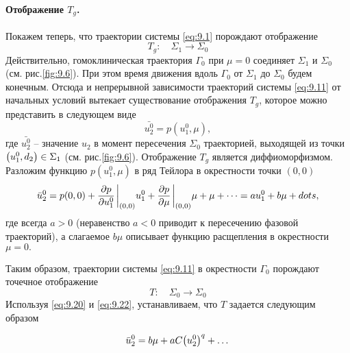 \paragraph{Отображение $T_g$.}%
Покажем теперь, что траектории системы \eqref{eq:9.1} порождают отображение
\begin{equation}
        \label{eq:}
        T_g: \quad \Sigma_1 \to \Sigma_0
\end{equation}
Действительно, гомоклиническая траектория $\Gamma_0$ при $\mu=0$ соединяет
$\Sigma_1$ и $\Sigma_0$ (см. рис.\ref{fig:9.6}). При этом время движения вдоль $\Gamma_0$ 
от $\Sigma_1$ до $\Sigma_0$ будем конечным.
Отсюда и непрерывной зависимости траекторий системы \eqref{eq:9.11} от начальных
условий вытекает существование отображения $T_g$, которое можно представить в
следующем виде
\begin{equation}
        \label{eq:9.21}
        \bar{ u_2^0} = p(u_1^0, \mu),
\end{equation}
где $\bar {u_2^0}$ -- значение $u_2$ в момент пересечения  $\Sigma_0$ траекторией, выходящей из 
точки $\qty( u_1^0,d_2) \in \Sigma_1$ (см. рис.\ref{fig:9.6}). Отображение $T_g$ является
диффиоморфизмом. Разложим функцию $p(u_1^0, \mu)$ в ряд Тейлора в окрестности точки $(0,0)$ 
\begin{equation}
        \label{eq:9.22}
        \bar u_2^0 = p(0,0) + \pdv{p}{u_1^0} \eval_{(0,0)} u_1^0 + \pdv{p}{\mu} \eval_{(0,0)}\mu
        + \mu + \dots = a u_1^0 + b \mu + dots,
\end{equation}
где всегда $a>0$ (неравенство $a<0$ приводит к пересечению фазовой траекторий),
а слагаемое $b \mu$ описывает функцию расщепления в окрестности $\mu=0.$

Таким образом, траектории системы \eqref{eq:9.11} в окрестности $\Gamma_0$ 
порождают точечное отображение
\begin{equation}
        \label{eq:}
        T: \quad \Sigma_0 \to \Sigma_0
\end{equation}
Используя \eqref{eq:9.20} и \eqref{eq:9.22}, устанавливаем, что $T$ задается    следующим образом

\begin{equation}
        \label{eq:9.23}
        \bar u_2^0 = b \mu + a C\qty(u_2^0)^q + \dots
\end{equation}

